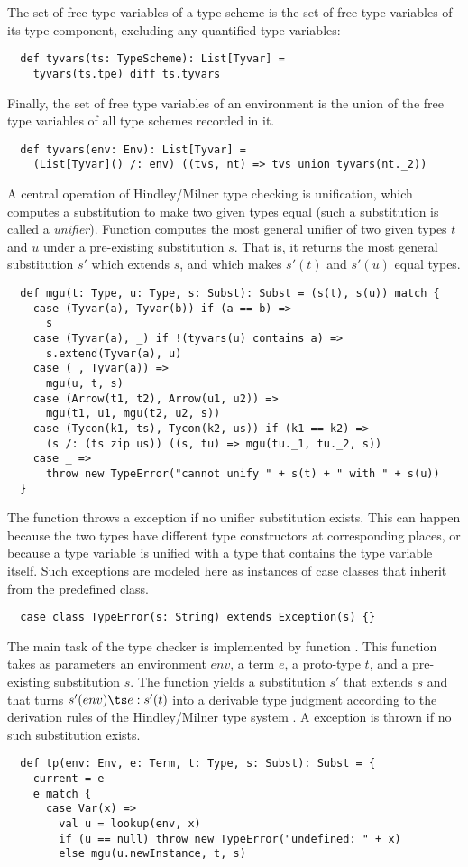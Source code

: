 {The set of free type variables of a type scheme is the set of free
type variables of its type component, excluding any quantified type variables:
\begin{lstlisting}
  def tyvars(ts: TypeScheme): List[Tyvar] = 
    tyvars(ts.tpe) diff ts.tyvars
\end{lstlisting}
Finally, the set of free type variables of an environment is the union
of the free type variables of all type schemes recorded in it.
\begin{lstlisting}
  def tyvars(env: Env): List[Tyvar] =
    (List[Tyvar]() /: env) ((tvs, nt) => tvs union tyvars(nt._2))
\end{lstlisting}
A central operation of Hindley/Milner type checking is unification,
which computes a substitution to make two given types equal (such a
substitution is called a {\em unifier}).  Function  computes
the most general unifier of two given types $t$ and $u$ under a
pre-existing substitution $s$.  That is, it returns the most general
substitution $s'$ which extends $s$, and which makes $s'(t)$ and
$s'(u)$ equal types. 
\begin{lstlisting}
  def mgu(t: Type, u: Type, s: Subst): Subst = (s(t), s(u)) match {
    case (Tyvar(a), Tyvar(b)) if (a == b) =>
      s
    case (Tyvar(a), _) if !(tyvars(u) contains a) =>
      s.extend(Tyvar(a), u)
    case (_, Tyvar(a)) =>
      mgu(u, t, s)
    case (Arrow(t1, t2), Arrow(u1, u2)) =>
      mgu(t1, u1, mgu(t2, u2, s))
    case (Tycon(k1, ts), Tycon(k2, us)) if (k1 == k2) =>
      (s /: (ts zip us)) ((s, tu) => mgu(tu._1, tu._2, s))
    case _ => 
      throw new TypeError("cannot unify " + s(t) + " with " + s(u))
  }
\end{lstlisting}
The  function throws a  exception if no
unifier substitution exists. This can happen because the two types
have different type constructors at corresponding places, or because a
type variable is unified with a type that contains the type variable
itself. Such exceptions are modeled here as instances of case classes
that inherit from the predefined  class.
\begin{lstlisting}
  case class TypeError(s: String) extends Exception(s) {}
\end{lstlisting}
The main task of the type checker is implemented by function
. This function takes as parameters an environment $env$, a
term $e$, a proto-type $t$, and a
pre-existing substitution $s$.  The function yields a substitution
$s'$ that extends $s$ and that
turns $s'(env) \ts e: s'(t)$ into a derivable type judgment according
to the derivation rules of the Hindley/Milner type system \cite{milner:polymorphism}.  A
 exception is thrown if no such substitution exists.
\begin{lstlisting}
  def tp(env: Env, e: Term, t: Type, s: Subst): Subst = {
    current = e
    e match {
      case Var(x) =>
        val u = lookup(env, x)
        if (u == null) throw new TypeError("undefined: " + x)
        else mgu(u.newInstance, t, s)


\end{lstlisting}}

